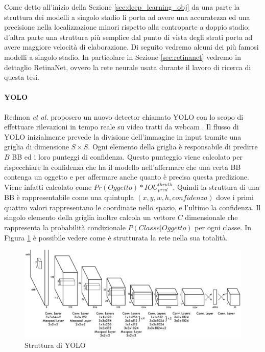 Come detto all'inizio della Sezione \ref{sec:deep_learning_obj} da una parte la struttura dei modelli a singolo stadio li porta ad avere una accuratezza ed una precisione nella localizzazione minori rispetto alla controparte a doppio stadio; d'altra parte una struttura più semplice dal punto di vista degli strati porta ad avere maggiore velocità di elaborazione. Di seguito vedremo alcuni dei più famosi modelli a singolo stadio. In particolare in Sezione \ref{sec:retinanet} vedremo in dettaglio RetinaNet, ovvero la rete neurale usata durante il lavoro di ricerca di questa tesi.


\paragraph{YOLO}
Redmon \textit{et al.} proposero un nuovo detector chiamato \ac{YOLO} con lo scopo di effettuare rilevazioni in tempo reale su video tratti da webcam \cite{redmon2016you}. 
Il flusso di \ac{YOLO} inizialmente prevede la divisione dell'immagine in input tramite una griglia di dimensione $S \times S$. 
Ogni elemento della griglia è responsabile di predirre $B$ \ac{BB} ed i loro punteggi di confidenza. Questo punteggio viene calcolato per rispecchiare la confidenza che ha il modello nell'affermare che una certa \ac{BB} contenga un oggetto e per affermare anche quanto è precisa questa predizione. Viene infatti calcolato come $Pr(Oggetto) * IOU^{thruth}_{pred}$.
Quindi la struttura di una \ac{BB} è rappresentabile come una quintupla $(x, y, w, h, confidenza)$ dove i primi quattro valori rappresentano le coordinate nello spazio, e l'ultimo la confidenza. 
Il singolo elemento della griglia inoltre calcola un vettore $C$ dimensionale che rappresenta la probabilità condizionale $P(Classe | Oggetto)$ per ogni classe. In Figura \ref{fig:yolo_structure} è possibile vedere come è strutturata la rete nella sua totalità. 
\begin{figure}[]
    \centering
    \includegraphics[width=\textwidth]{images/net_yolo.pdf}
    \caption{Struttura di \ac{YOLO} \cite{redmon2016you}}
    \label{fig:yolo_structure}
\end{figure}


